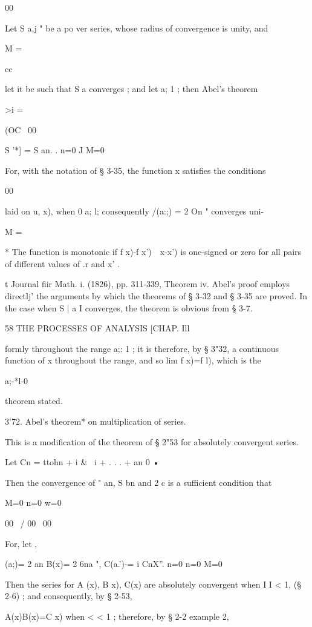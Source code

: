 00

Let S a,j " be a po ver series, whose radius of convergence is unity,
and

M =

cc

let it be such that S a converges ; and let a; 1 ; then Abel's theorem

>i =

(OC \ 00

S '*] = S an. . n=0 J M=0

For, with the notation of § 3-35, the function x satisfies the
conditions

00

laid on u, x), when 0 a; l; consequently /(a:;) = 2 On " converges
uni-

M =

* The function is monotonic if f x)-f x')\ \ x-x') is one-signed or
zero for all pairs of different values of .r and x' .

t Journal fiir Math. i. (1826), pp. 311-339, Theorem iv. Abel's proof
employs directlj' the arguments by which the theorems of § 3-32 and §
3-35 are proved. In the case when S | a I converges, the theorem is
obvious from § 3-7.



58 THE PROCESSES OF ANALYSIS [CHAP. Ill

formly throughout the range a;: 1 ; it is therefore, by § 3"32, a
continuous function of x throughout the range, and so lim f x)=f l),
which is the

a;-*l-0

theorem stated.

3'72. Abel's theorem* on multiplication of series.

This is a modification of the theorem of § 2"53 for absolutely
convergent series.

Let Cn = ttohn + i \& \ i + . . . + an 0 •

Then the convergence of " an, S bn and 2 c is a sufficient condition
that

M=0 n=0 w=0

 00 \ / 00 \ 00

For, let ,

 (a;)= 2 an B(x)= 2 6na ", C(a.')-= i CnX''. n=0 n=0 M=0

Then the series for A (x), B x), C(x) are absolutely convergent when I
I < 1, (§ 2-6) ; and consequently, by § 2-53,

A(x)B(x)=C x) when < < 1 ; therefore, by § 2-2 example 2,

